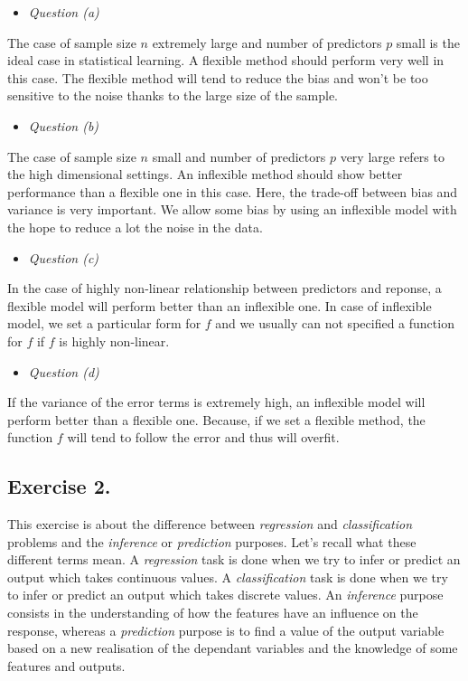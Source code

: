 \documentclass[]{book}
\providecommand{\tightlist}{%
  \setlength{\itemsep}{0pt}\setlength{\parskip}{0pt}}
\begin{document}
\begin{itemize}
\tightlist
\item
  \emph{Question (a)}
\end{itemize}

The case of sample size \(n\) extremely large and number of predictors \(p\) small is the ideal case in statistical learning. A flexible method should perform very well in this case. The flexible method will tend to reduce the bias and won't be too sensitive to the noise thanks to the large size of the sample.

\begin{itemize}
\tightlist
\item
  \emph{Question (b)}
\end{itemize}

The case of sample size \(n\) small and number of predictors \(p\) very large refers to the high dimensional settings. An inflexible method should show better performance than a flexible one in this case. Here, the trade-off between bias and variance is very important. We allow some bias by using an inflexible model with the hope to reduce a lot the noise in the data.

\begin{itemize}
\tightlist
\item
  \emph{Question (c)}
\end{itemize}

In the case of highly non-linear relationship between predictors and reponse, a flexible model will perform better than an inflexible one. In case of inflexible model, we set a particular form for \(f\) and we usually can not specified a function for \(f\) if \(f\) is highly non-linear.

\begin{itemize}
\tightlist
\item
  \emph{Question (d)}
\end{itemize}

If the variance of the error terms is extremely high, an inflexible model will perform better than a flexible one. Because, if we set a flexible method, the function \(f\) will tend to follow the error and thus will overfit.

\hypertarget{exercise-2.}{%
\subsection{Exercise 2.}\label{exercise-2.}}

This exercise is about the difference between \emph{regression} and \emph{classification} problems and the \emph{inference} or \emph{prediction} purposes. Let's recall what these different terms mean. A \emph{regression} task is done when we try to infer or predict an output which takes continuous values. A \emph{classification} task is done when we try to infer or predict an output which takes discrete values. An \emph{inference} purpose consists in the understanding of how the features have an influence on the response, whereas a \emph{prediction} purpose is to find a value of the output variable based on a new realisation of the dependant variables and the knowledge of some features and outputs.
\end{document}
